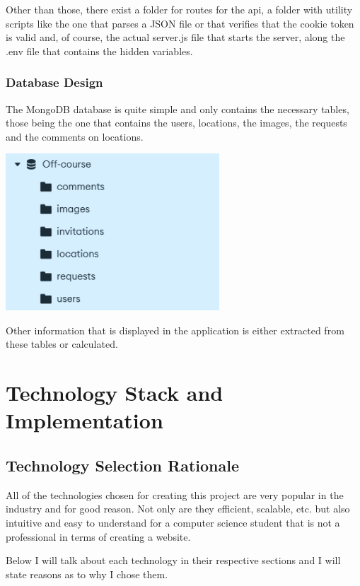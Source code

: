 \documentclass[12pt,a4paper]{report}
\begin{document}
Other than those, there exist a folder for routes for the api, a folder with utility scripts like the one that parses a JSON file or that verifies that the cookie token is valid and, of course, the actual server.js file that starts the server, along the .env file that contains the hidden variables. 

\subsection{Database Design}

The MongoDB database is quite simple and only contains the necessary tables, those being the one that contains the users, locations, the images, the requests and the comments on locations.

\begin{center}
\includegraphics[width=0.6\textwidth]{images/database.png}
\end{center}

Other information that is displayed in the application is either extracted from these tables or calculated.

\chapter{Technology Stack and Implementation}
\section{Technology Selection Rationale}

All of the technologies chosen for creating this project are very popular in the industry and for good reason. Not only are they efficient, scalable, etc. but also intuitive and easy to understand for a computer science student that is not a professional in terms of creating a website.

Below I will talk about each technology in their respective sections and I will state reasons as to why I chose them.
\end{document}
